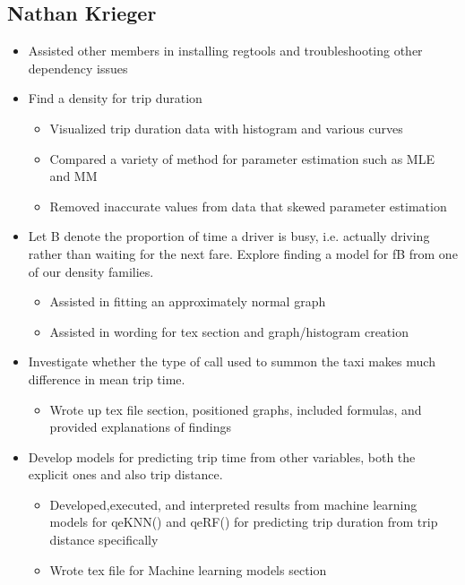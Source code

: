 \documentclass{article}
\numberwithin{equation}{section}
\begin{document}
\subsection{Nathan Krieger}
\begin{itemize}
\item Assisted other members in installing regtools and troubleshooting other dependency issues
 \item Find a density for trip duration
  \begin{itemize}
    \item Visualized trip duration data with histogram and various curves
    \item Compared a variety of method for parameter estimation such as MLE and MM
    \item Removed inaccurate values from data that skewed parameter estimation
   \end{itemize}
   
  \item Let B denote the proportion of time a driver is busy, i.e. actually driving rather than waiting for the next fare. Explore finding a model for fB from one of our density families.
    \begin{itemize}
     \item Assisted in fitting an approximately normal graph  
     \item Assisted in wording for tex section and graph/histogram creation
   \end{itemize}
  \item Investigate whether the type of call used to summon the taxi makes much difference in mean trip time.
    \begin{itemize}
     \item Wrote up tex file section, positioned graphs, included formulas, and provided explanations of findings
   \end{itemize}
  \item Develop models for predicting trip time from other variables, both the explicit ones and also trip distance. 
    \begin{itemize}
     \item Developed,executed, and interpreted results from machine learning models for qeKNN() and qeRF() for predicting trip duration from trip distance specifically
     \item Wrote tex file for Machine learning models section 
    \end{itemize}

\end{itemize}
\end{document}

